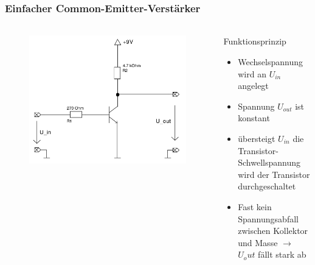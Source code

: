 \begin{frame}
    \frametitle{Einfacher Common-Emitter-Verstärker}
    \framesubtitle{}
     \begin{columns}[c]
        \begin{figure}[H]
        \begin{center}
                \includegraphics[scale=0.16]{./img/schaltungen/common_emitter_einfach.png}
        \end{center}
        \end{figure}
         \begin{block}{Funktionsprinzip}
            \begin{itemize}
                \item Wechselspannung wird an $U_{in}$ angelegt
                \item Spannung $U_{out}$ ist konstant
                \item übersteigt $U_{in}$ die Transistor-Schwellspannung wird
                der Transistor durchgeschaltet
                \item Fast kein Spannungsabfall zwischen Kollektor und Masse
                $\rightarrow$ $U_out$ fällt stark ab
            \end{itemize}    
         \end{block}
     \end{columns}
\end{frame}
